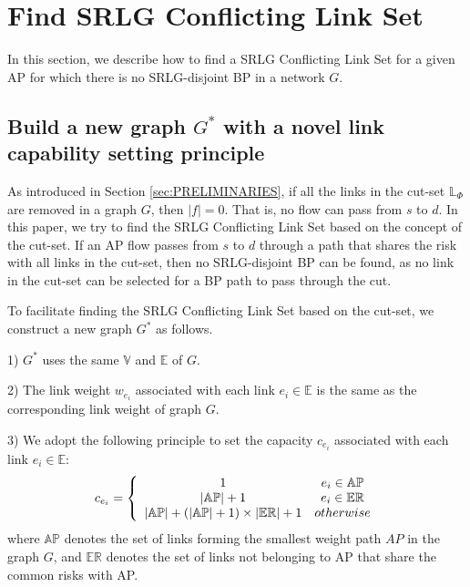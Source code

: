 \section{Find SRLG Conflicting Link Set}
\label{sec:Find SRLG conflict link set}
In this section, we describe how to find a SRLG Conflicting Link Set for a given AP for which there is no SRLG-disjoint BP in a network $G$.

\subsection{Build a new graph $G^*$ with a novel link capability setting principle}


As introduced in Section \ref{sec:PRELIMINARIES},  if all the links in the cut-set $\mathbb{\mathbb{L}}_{\Phi}$ are removed in a graph $G$, then $|f| = 0$. That is, no flow can pass from $s$ to $d$. In this paper,  we try to find the SRLG Conflicting Link Set based on the concept of the cut-set. If an AP flow passes from $s$ to $d$ through a path that shares the risk with  all links in the cut-set, then no SRLG-disjoint BP can be found, as no link in the cut-set can be selected for a BP path to pass through the cut.



To facilitate finding the SRLG Conflicting Link Set based on the cut-set, we construct a new graph $G^*$ as follows.

1) $G^*$ uses the same ${\mathbb{V}}$ and ${\mathbb{E}}$ of $G$.

2) The link weight $w_{e_i}$ associated with each link $e_i \in \mathbb{E}$ is the same as the corresponding link weight of graph $G$.

3) We adopt the following principle to set the capacity $c_{e_i}$ associated with each link $e_i \in \mathbb{E}$:
  \begin{equation}
c_{e_i} = \left\{ {\begin{array}{*{20}{c}}
   1 & {e_i{\rm{ }} \in {\rm{ \mathbb{AP}}}}  \\
   {\left| \mathbb{AP} \right|+1} & {e_i{\rm{ }} \in {\rm{ \mathbb{E}}}{{\rm{\mathbb{R}}}}}  \\
   {\left| {{\rm\mathbb{AP}}} \right| + \left( {\left| {{\rm\mathbb{AP}}} \right| + 1} \right)\times \left| {{\rm{\mathbb{E}}}{{\rm{\mathbb{R}}}}} \right| + 1} & {otherwise}  \\
\end{array}} \right.
\label{eq:capacity principle}
\end{equation}
where $\mathbb{AP}$ denotes the set of links forming the smallest weight path $AP$ in the graph $G$,  and $\mathbb{\mathbb{ER}}$ denotes the set of links not belonging to AP that share the common risks with AP.

